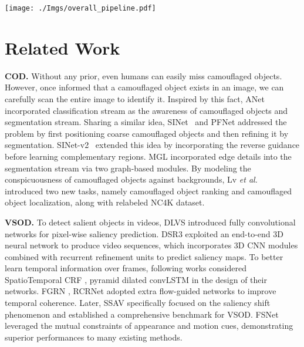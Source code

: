 \documentclass[10pt,twocolumn,letterpaper]{article}
\def\etal{\emph{et al.}}
\def\Ourmodel{SLT-Net}
\begin{document}
\begin{figure*}[ht]
\begin{center}
\texttt{[image: ./Imgs/overall\_pipeline.pdf]}
\end{center}
\vspace{-20pt}
\caption{The overall pipeline of the  \Ourmodel. The \Ourmodel~consists of a short-term detection module and a long-term refinement module. The short-term detection module takes a pair of consecutive frames and predicts the camouflaged object mask for the reference frame. The long-term refinement module takes  predictions from the short-term detection module along with their corresponding referenced frames to generate the final predictions.}
\label{fig:overall}
\end{figure*}


\section{Related Work}\label{sec:related_work}
\noindent\textbf{COD.} 
Without any prior, even humans can easily miss camouflaged objects. However, once informed that a camouflaged object exists in an image, we can carefully scan the entire image to identify it. 
Inspired by this fact, ANet~\cite{ltnghia-CVIU2019} incorporated classification stream as the awareness of camouflaged objects and segmentation stream. Sharing a similar idea, SINet~\cite{fan2020Camouflage} and PFNet \cite{mei2021camouflaged} addressed the problem by first positioning coarse camouflaged objects and then refining it by segmentation. SINet-v2~\cite{fan2021concealed} extended this idea by incorporating the reverse guidance before learning complementary regions. MGL \cite{zhai2021mutual} incorporated edge details into the segmentation stream via two graph-based modules. By modeling the conspicuousness of camouflaged objects against backgrounds, Lv \etal~\cite{lv2021simultaneously} introduced two new tasks, namely camouflaged object ranking and camouflaged object localization, along with relabeled NC4K dataset.  

\noindent\textbf{VSOD.}
To detect salient objects in videos, DLVS \cite{wang2017video} introduced fully convolutional networks for pixel-wise saliency prediction. DSR3 \cite{le2017deeply} exploited an end-to-end 3D neural network to produce video sequences, which incorporates 3D CNN modules combined with recurrent refinement units to predict saliency maps. To better learn temporal information over frames, following works considered SpatioTemporal CRF \cite{le2018video}, pyramid dilated convLSTM \cite{song2018pyramid} in the design of their networks. FGRN \cite{li2018flow}, RCRNet \cite{yan2019semi} adopted extra flow-guided networks to improve temporal coherence. Later, SSAV \cite{Fan2019VideoSal} specifically focused on the saliency shift phenomenon and established a comprehensive benchmark for VSOD. FSNet \cite{ji2021FSNet} leveraged the mutual constraints of appearance and motion cues, demonstrating superior performances to many existing methods.
\end{document}
